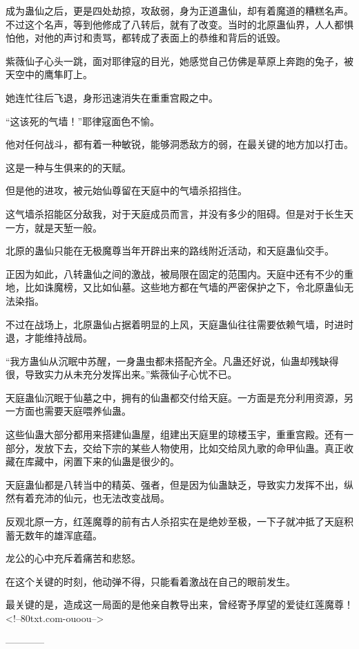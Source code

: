\begin{this_body}
成为蛊仙之后，更是四处劫掠，攻敌弱，身为正道蛊仙，却有着魔道的糟糕名声。不过这个名声，等到他修成了八转后，就有了改变。当时的北原蛊仙界，人人都惧怕他，对他的声讨和责骂，都转成了表面上的恭维和背后的诋毁。

紫薇仙子心头一跳，面对耶律寇的目光，她感觉自己仿佛是草原上奔跑的兔子，被天空中的鹰隼盯上。

她连忙往后飞退，身形迅速消失在重重宫殿之中。

“这该死的气墙！”耶律寇面色不愉。

他对任何战斗，都有着一种敏锐，能够洞悉敌方的弱，在最关键的地方加以打击。

这是一种与生俱来的的天赋。

但是他的进攻，被元始仙尊留在天庭中的气墙杀招挡住。

这气墙杀招能区分敌我，对于天庭成员而言，并没有多少的阻碍。但是对于长生天一方，就是天堑一般。

北原的蛊仙只能在无极魔尊当年开辟出来的路线附近活动，和天庭蛊仙交手。

正因为如此，八转蛊仙之间的激战，被局限在固定的范围内。天庭中还有不少的重地，比如诛魔榜，又比如仙墓。这些地方都在气墙的严密保护之下，令北原蛊仙无法染指。

不过在战场上，北原蛊仙占据着明显的上风，天庭蛊仙往往需要依赖气墙，时进时退，才能维持战局。

“我方蛊仙从沉眠中苏醒，一身蛊虫都未搭配齐全。凡蛊还好说，仙蛊却残缺得很，导致实力从未充分发挥出来。”紫薇仙子心忧不已。

天庭蛊仙沉眠于仙墓之中，拥有的仙蛊都交付给天庭。一方面是充分利用资源，另一方面也需要天庭喂养仙蛊。

这些仙蛊大部分都用来搭建仙蛊屋，组建出天庭里的琼楼玉宇，重重宫殿。还有一部分，发放下去，交给下宗的某些人物使用，比如交给凤九歌的命甲仙蛊。真正收藏在库藏中，闲置下来的仙蛊是很少的。

天庭蛊仙都是八转当中的精英、强者，但是因为仙蛊缺乏，导致实力发挥不出，纵然有着充沛的仙元，也无法改变战局。

反观北原一方，红莲魔尊的前有古人杀招实在是绝妙至极，一下子就冲抵了天庭积蓄无数年的雄浑底蕴。

龙公的心中充斥着痛苦和悲怒。

在这个关键的时刻，他动弹不得，只能看着激战在自己的眼前发生。

最关键的是，造成这一局面的是他亲自教导出来，曾经寄予厚望的爱徒红莲魔尊！<!--80txt.com-ouoou-->

------------

\end{this_body}

